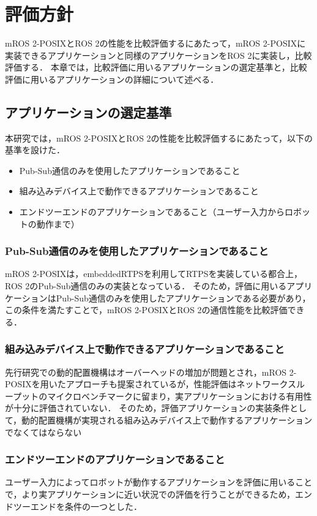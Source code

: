 \chapter{評価方針}
\label{chap:evaluation}
mROS 2-POSIXとROS 2の性能を比較評価するにあたって，mROS 2-POSIXに実装できるアプリケーションと同様のアプリケーションをROS 2に実装し，比較評価する．
本章では，比較評価に用いるアプリケーションの選定基準と，比較評価に用いるアプリケーションの詳細について述べる．
\section{アプリケーションの選定基準}
本研究では，mROS 2-POSIXとROS 2の性能を比較評価するにあたって，以下の基準を設けた．
\begin{itemize}
    \item Pub-Sub通信のみを使用したアプリケーションであること
    \item 組み込みデバイス上で動作できるアプリケーションであること
    \item エンドツーエンドのアプリケーションであること（ユーザー入力からロボットの動作まで）
\end{itemize}
\subsection{Pub-Sub通信のみを使用したアプリケーションであること}
mROS 2-POSIXは，embeddedRTPSを利用してRTPSを実装している都合上，ROS 2のPub-Sub通信のみの実装となっている．
そのため，評価に用いるアプリケーションはPub-Sub通信のみを使用したアプリケーションである必要があり，この条件を満たすことで，mROS 2-POSIXとROS 2の通信性能を比較評価できる．
\subsection{組み込みデバイス上で動作できるアプリケーションであること}
 先行研究での動的配置機構はオーバーヘッドの増加が問題とされ，mROS 2-POSIXを用いたアプローチも提案されているが，性能評価はネットワークスループットのマイクロベンチマークに留まり，実アプリケーションにおける有用性が十分に評価されていない．
 そのため，評価アプリケーションの実装条件として，動的配置機構が実現される組み込みデバイス上で動作するアプリケーションでなくてはならない
\subsection{エンドツーエンドのアプリケーションであること}
ユーザー入力によってロボットが動作するアプリケーションを評価に用いることで，より実アプリケーションに近い状況での評価を行うことができるため，エンドツーエンドを条件の一つとした．